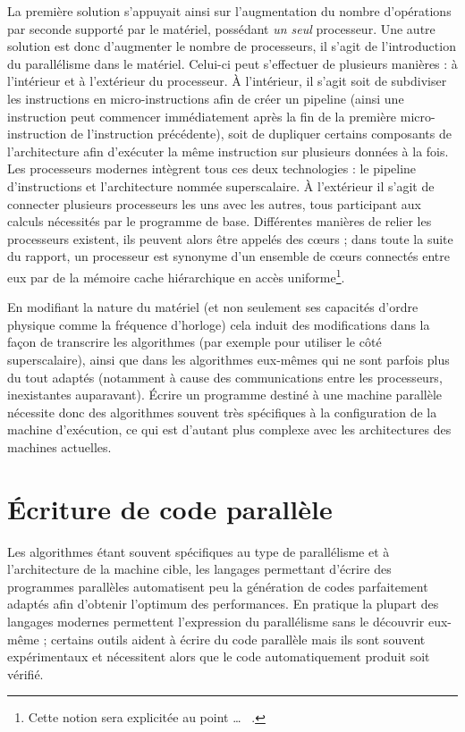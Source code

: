 La première solution s'appuyait ainsi sur l'augmentation du nombre d'opérations par seconde supporté par le matériel, possédant \emph{un seul} processeur. Une autre solution est donc d'augmenter le nombre de processeurs, il s'agit de l'introduction du parallélisme dans le matériel. Celui-ci peut s'effectuer de plusieurs manières : à l'intérieur et à l'extérieur du processeur. À l'intérieur, il s'agit soit de subdiviser les instructions en  micro-instructions afin de créer un pipeline (ainsi une instruction peut commencer immédiatement après la fin de la première micro-instruction de l'instruction précédente), soit de dupliquer certains composants de l'architecture afin d'exécuter la même instruction sur plusieurs données à la fois. Les processeurs modernes intègrent tous ces deux technologies : le pipeline d'instructions et l'architecture nommée superscalaire.  À l'extérieur il s'agit de connecter plusieurs processeurs les uns avec les autres, tous participant aux calculs nécessités par le programme de base. Différentes manières de relier les processeurs existent, ils peuvent alors être appelés des cœurs ; dans toute la suite du rapport, un processeur est synonyme d'un ensemble de cœurs connectés entre eux par de la mémoire cache hiérarchique en accès uniforme\footnote{Cette notion sera explicitée au point \ldots~ .}.

En modifiant la nature du matériel (et non seulement ses capacités d'ordre physique comme la fréquence d'horloge) cela induit des modifications dans la façon de transcrire les algorithmes (par exemple pour utiliser le côté superscalaire), ainsi que dans les algorithmes eux-mêmes qui ne sont parfois plus du tout adaptés (notamment à cause des communications entre les processeurs, inexistantes auparavant). Écrire un programme destiné à une machine parallèle nécessite donc des algorithmes souvent très spécifiques à la configuration de la machine d'exécution, ce qui est d'autant plus complexe avec les architectures des machines actuelles.

\section{\'Ecriture de code parallèle}

Les algorithmes étant souvent spécifiques au type de parallélisme et à l'architecture de la machine cible, les langages permettant d'écrire des programmes parallèles automatisent peu la génération de codes parfaitement adaptés afin d'obtenir l'optimum des performances. En pratique la plupart des langages modernes permettent l'expression du parallélisme sans le découvrir eux-même ; certains outils aident à écrire du code parallèle mais ils sont souvent expérimentaux et nécessitent alors que le code automatiquement produit soit vérifié.

